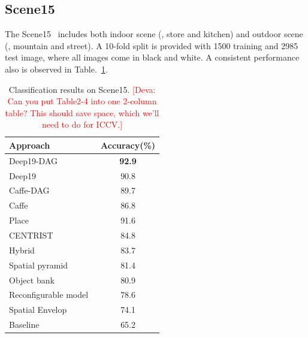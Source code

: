 \documentclass[10pt,twocolumn,letterpaper]{article}
\newcommand{\deva}[1]{\textcolor{red}{[Deva: #1]}}
\begin{document}
\subsection{Scene15}

The Scene15~\cite{Scene15} includes both indoor scene (\eg, store and kitchen) and outdoor scene (\eg, mountain and street). A 10-fold split is provided with 1500 training and 2985 test image, where all images come in black and white. A consistent performance also is observed in Table.~\ref{table:Scene15}. 

\begin{table}[htbp]
\begin{center}
\begin{tabular}{|l|c|}
\hline
Approach & Accuracy(\%) \\
\hline
Deep19-DAG & \textbf{92.9} \\
Deep19~\cite{veryDeep} & 90.8 \\
Caffe-DAG & 89.7	\\
Caffe~\cite{Caffe} & 86.8 \\ \hline
Place~\cite{zhoulearning} & 91.6 \\
CENTRIST~\cite{Wu_pami11} & 84.8	\\
Hybrid~\cite{Bosch_pami08}	& 83.7	\\
Spatial pyramid~\cite{spatial_pyramid} & 81.4 \\
Object bank~\cite{Li_nips10_objectbank}	& 80.9	\\
Reconfigurable model~\cite{Parizi_cvpr12_reconf} & 78.6	\\
Spatial Envelop~\cite{Oliva_ijcv01_envelop} & 74.1 \\
Baseline~\cite{Scene15} & 65.2 \\
\hline
\end{tabular}
\end{center}
\caption{Classification results on Scene15. \deva{Can you put Table2-4 into one 2-column table? This should save space, which we'll need to do for ICCV.}}
\label{table:Scene15}
\end{table}


\end{document}
